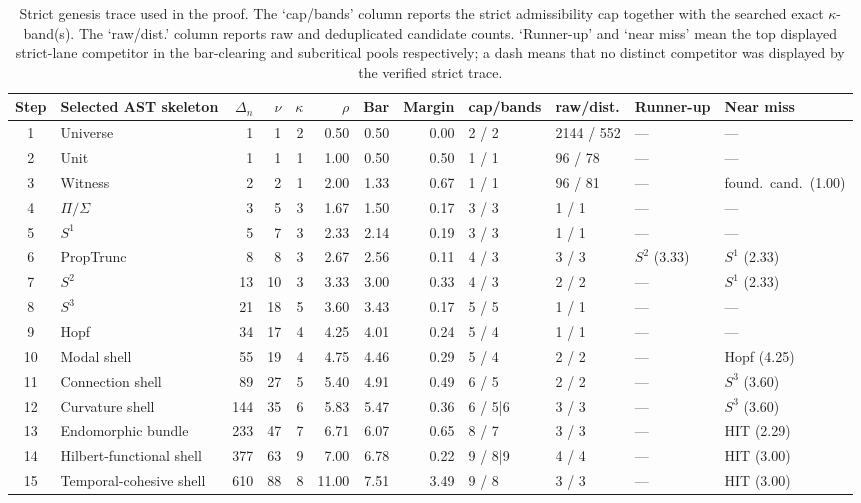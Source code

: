 \documentclass[11pt,a4paper]{article}
\theoremstyle{plain}
\theoremstyle{definition}
\theoremstyle{remark}
\begin{document}
\begin{table}[tbp]
\centering
\caption{Strict genesis trace used in the proof.
The `cap/bands' column reports the strict admissibility cap together with the
searched exact $\kappa$-band(s).
The `raw/dist.' column reports raw and deduplicated candidate counts.
`Runner-up' and `near miss' mean the top displayed strict-lane competitor in the
bar-clearing and subcritical pools respectively; a dash means that no distinct
competitor was displayed by the verified strict trace.}
\label{tab:genesis-sequence-trace}
\tiny
\setlength{\tabcolsep}{2pt}
\begin{tabular}{@{}c l r r r r r r l l >{\raggedright\arraybackslash}p{1.6cm} >{\raggedright\arraybackslash}p{1.6cm}@{}}
\toprule
Step & Selected AST skeleton & $\Delta_n$ & $\nu$ & $\kappa$ & $\rho$ & Bar & Margin & cap/bands & raw/dist. & Runner-up & Near miss \\
\midrule
1  & Universe    & 1   & 1  & 2 & 0.50 & 0.50 & 0.00 & 2 / 2   & 2144 / 552 & --- & --- \\
2  & Unit        & 1   & 1  & 1 & 1.00 & 0.50 & 0.50 & 1 / 1   & 96 / 78    & --- & --- \\
3  & Witness     & 2   & 2  & 1 & 2.00 & 1.33 & 0.67 & 1 / 1   & 96 / 81    & --- & found.\ cand.\ (1.00) \\
4  & $\Pi/\Sigma$ & 3  & 5  & 3 & 1.67 & 1.50 & 0.17 & 3 / 3   & 1 / 1      & --- & --- \\
5  & $S^1$       & 5   & 7  & 3 & 2.33 & 2.14 & 0.19 & 3 / 3   & 1 / 1      & --- & --- \\
6  & PropTrunc   & 8   & 8  & 3 & 2.67 & 2.56 & 0.11 & 4 / 3   & 3 / 3      & $S^2$ (3.33) & $S^1$ (2.33) \\
7  & $S^2$       & 13  & 10 & 3 & 3.33 & 3.00 & 0.33 & 4 / 3   & 2 / 2      & --- & $S^1$ (2.33) \\
8  & $S^3$       & 21  & 18 & 5 & 3.60 & 3.43 & 0.17 & 5 / 5   & 1 / 1      & --- & --- \\
9  & Hopf        & 34  & 17 & 4 & 4.25 & 4.01 & 0.24 & 5 / 4   & 1 / 1      & --- & --- \\
10 & Modal shell & 55  & 19 & 4 & 4.75 & 4.46 & 0.29 & 5 / 4   & 2 / 2      & --- & Hopf (4.25) \\
11 & Connection shell & 89  & 27 & 5 & 5.40 & 4.91 & 0.49 & 6 / 5   & 2 / 2      & --- & $S^3$ (3.60) \\
12 & Curvature shell & 144 & 35 & 6 & 5.83 & 5.47 & 0.36 & 6 / 5|6 & 3 / 3      & --- & $S^3$ (3.60) \\
13 & Endomorphic bundle & 233 & 47 & 7 & 6.71 & 6.07 & 0.65 & 8 / 7   & 3 / 3      & --- & HIT (2.29) \\
14 & Hilbert-functional shell & 377 & 63 & 9 & 7.00 & 6.78 & 0.22 & 9 / 8|9 & 4 / 4      & --- & HIT (3.00) \\
15 & Temporal-cohesive shell & 610 & 88 & 8 & 11.00 & 7.51 & 3.49 & 9 / 8   & 3 / 3      & --- & HIT (3.00) \\
\bottomrule
\end{tabular}
\end{table}
\end{document}
